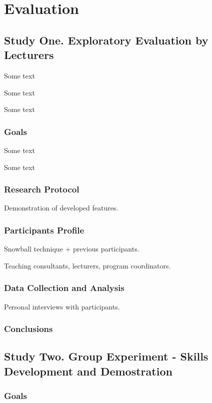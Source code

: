 \chapter{Evaluation\label{cha:evaluation}}

\section{Study One. Exploratory Evaluation by Lecturers}

Some text

Some text

Some text

\subsection{Goals}

Some text

Some text

\subsection{Research Protocol}

Demonstration of developed features.

\subsection{Participants Profile}
Snowball technique + previous participants.

Teaching consultants, lecturers, program coordinators.

\subsection{Data Collection and Analysis}

Personal interviews with participants.

\subsection{Conclusions}
 
\section{Study Two. Group Experiment - \LLLc Skills Development and
Demostration}

\subsection{Goals}

